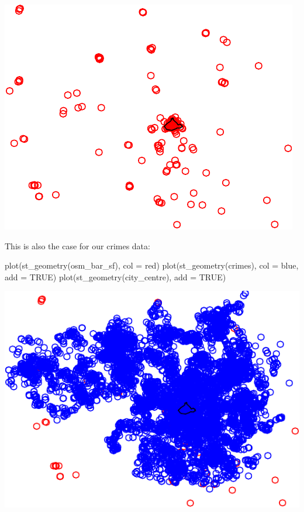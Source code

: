\documentclass[
]{book}
\newenvironment{Shaded}{\begin{snugshade}}{\end{snugshade}}
\newcommand{\AttributeTok}[1]{\textcolor[rgb]{0.77,0.63,0.00}{#1}}
\newcommand{\ConstantTok}[1]{\textcolor[rgb]{0.00,0.00,0.00}{#1}}
\newcommand{\FunctionTok}[1]{\textcolor[rgb]{0.00,0.00,0.00}{#1}}
\newcommand{\NormalTok}[1]{#1}
\newcommand{\StringTok}[1]{\textcolor[rgb]{0.31,0.60,0.02}{#1}}
\begin{document}
\includegraphics{crime_mapping_files/figure-latex/plot_bars-1.pdf}

This is also the case for our crimes data:

\begin{Shaded}
\begin{Highlighting}[]
\FunctionTok{plot}\NormalTok{(}\FunctionTok{st\_geometry}\NormalTok{(osm\_bar\_sf), }\AttributeTok{col =} \StringTok{\textquotesingle{}red\textquotesingle{}}\NormalTok{)}
\FunctionTok{plot}\NormalTok{(}\FunctionTok{st\_geometry}\NormalTok{(crimes), }\AttributeTok{col =} \StringTok{\textquotesingle{}blue\textquotesingle{}}\NormalTok{, }\AttributeTok{add =} \ConstantTok{TRUE}\NormalTok{)}
\FunctionTok{plot}\NormalTok{(}\FunctionTok{st\_geometry}\NormalTok{(city\_centre), }\AttributeTok{add =} \ConstantTok{TRUE}\NormalTok{)}
\end{Highlighting}
\end{Shaded}

\includegraphics{crime_mapping_files/figure-latex/plot_crimes-1.pdf}
\end{document}
